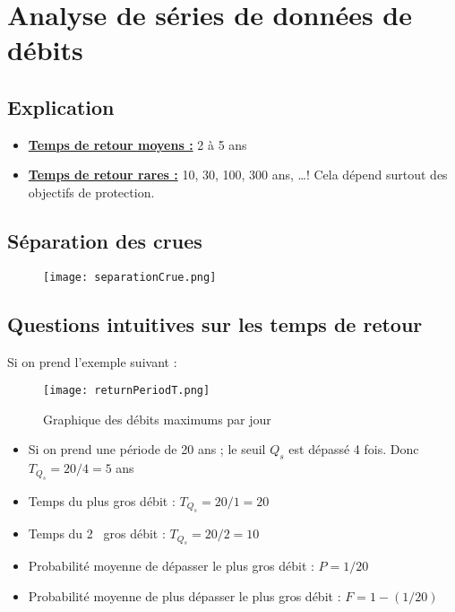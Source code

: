 \chapter{Analyse de séries de données de débits}

\section{Explication}
\begin{itemize}
    \item \underline{\textbf{Temps de retour moyens :}} 2 à 5 ans
    \item \underline{\textbf{Temps de retour rares :}} 10, 30, 100, 300 ans, \dots ! Cela dépend surtout des objectifs de protection.
\end{itemize}

\section{Séparation des crues}
\begin{figure}[H]
    \centering
    \texttt{[image: separationCrue.png]}
    \label{fig:separationCrues}
\end{figure}

\newpage

\section{Questions intuitives sur les temps de retour}
Si on prend l'exemple suivant :
\begin{figure}[h!]
    \centering
    \texttt{[image: returnPeriodT.png]}
    \caption{Graphique des débits maximums par jour}
    \label{fig:graphiqueExemple}
\end{figure}

\begin{itemize}
    \item Si on prend une période de 20 ans ; le seuil $Q_s$ est dépassé 4 fois. Donc $T_{Q_{s}} = 20/4 = 5$ ans
    \item Temps du plus gros débit : $T_{Q_{s}} = 20/1 = 20$
    \item Temps du 2\ieme ~ gros débit : $T_{Q_{s}} = 20/2 = 10$
    \item Probabilité moyenne de dépasser le plus gros débit : $P = 1/20$
    \item Probabilité moyenne de plus dépasser le plus gros débit : $F=1-(1/20)$
\end{itemize}

